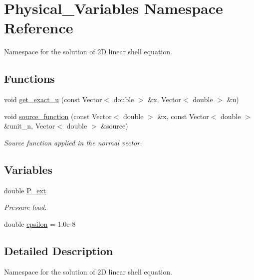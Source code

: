 \hypertarget{namespacePhysical__Variables}{}\section{Physical\+\_\+\+Variables Namespace Reference}
\label{namespacePhysical__Variables}


Namespace for the solution of 2D linear shell equation.  


\subsection*{Functions}
\begin{DoxyCompactItemize}
\item 
void \hyperlink{namespacePhysical__Variables_af90d0c580c57b1152fd1cc7046055031}{get\+\_\+exact\+\_\+u} (const Vector$<$ double $>$ \&x, Vector$<$ double $>$ \&u)
\item 
void \hyperlink{namespacePhysical__Variables_a36f0d0dc5f8aa4eafd7c4d6fe943c4e8}{source\+\_\+function} (const Vector$<$ double $>$ \&x, const Vector$<$ double $>$ \&unit\+\_\+n, Vector$<$ double $>$ \&source)
\begin{DoxyCompactList}\small\item\em Source function applied in the normal vector. \end{DoxyCompactList}\end{DoxyCompactItemize}
\subsection*{Variables}
\begin{DoxyCompactItemize}
\item 
double \hyperlink{namespacePhysical__Variables_a58adc76bae4751599143c613f9100904}{P\+\_\+ext}
\begin{DoxyCompactList}\small\item\em Pressure load. \end{DoxyCompactList}\item 
double \hyperlink{namespacePhysical__Variables_ac374cc60da0f1e5df3fc48a3c9ce1d74}{epsilon} = 1.\+0e-\/8
\end{DoxyCompactItemize}


\subsection{Detailed Description}
Namespace for the solution of 2D linear shell equation. 

